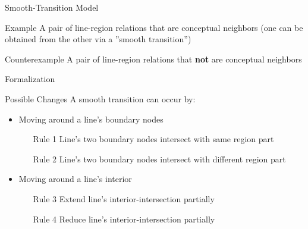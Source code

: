 	\begin{frame}{Smooth-Transition Model}
		\begin{block}{Example}
			A pair of line-region relations that are conceptual neighbors (one can be obtained from the other via a ''smooth transition'')
		\end{block}
		
		\begin{block}{Counterexample}
			A pair of line-region relations that \textbf{not} are conceptual neighbors
		\end{block}
	\end{frame}
	
	\begin{frame}{Formalization}
		\begin{block}{Possible Changes} A smooth transition can occur by:
			\begin{itemize}
				\item Moving around a line's boundary nodes
				\begin{itemize}
					\item[Rule 1] Line's two boundary nodes intersect with same region part
					\item[Rule 2] Line's two boundary nodes intersect with different region part
				\end{itemize}
				\item Moving around a line's interior
				\begin{enumerate}
					\item[Rule 3] Extend line's interior-intersection partially
					\item[Rule 4] Reduce line's interior-intersection partially
				\end{enumerate}
			\end{itemize}
		\end{block}
		
	\end{frame}
	
